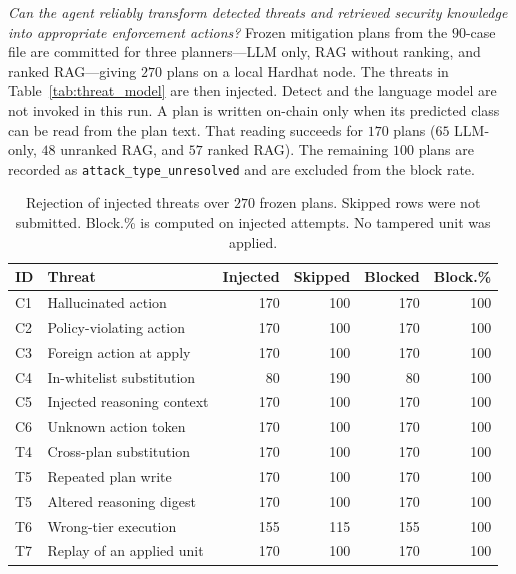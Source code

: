 \documentclass[10pt, conference]{IEEEtran}
\begin{document}
\textit{Can the agent reliably transform detected threats and retrieved security knowledge into appropriate enforcement actions?}
Frozen mitigation plans from the $90$-case file are committed for three planners---LLM only, RAG without ranking, and ranked RAG---giving $270$ plans on a local Hardhat node. The threats in Table~\ref{tab:threat_model} are then injected. Detect and the language model are not invoked in this run. A plan is written on-chain only when its predicted class can be read from the plan text. That reading succeeds for $170$ plans ($65$ LLM-only, $48$ unranked RAG, and $57$ ranked RAG). The remaining $100$ plans are recorded as \texttt{attack\_type\_unresolved} and are excluded from the block rate.

\begin{table}[t]
\centering
\caption{Rejection of injected threats over $270$ frozen plans. Skipped rows were not submitted. Block.\% is computed on injected attempts. No tampered unit was applied.}
\label{tab:agentic}
\setlength{\tabcolsep}{3.5pt}
{\footnotesize
\begin{tabular}{@{}llrrrr@{}}
\toprule
\textbf{ID} & \textbf{Threat} & \textbf{Injected} & \textbf{Skipped} & \textbf{Blocked} & \textbf{Block.\%}\\
\midrule
C1 & Hallucinated action & 170 & 100 & 170 & 100\\
C2 & Policy-violating action & 170 & 100 & 170 & 100\\
C3 & Foreign action at apply & 170 & 100 & 170 & 100\\
C4 & In-whitelist substitution & 80 & 190 & 80 & 100\\
C5 & Injected reasoning context & 170 & 100 & 170 & 100\\
C6 & Unknown action token & 170 & 100 & 170 & 100\\
T4 & Cross-plan substitution & 170 & 100 & 170 & 100\\
T5 & Repeated plan write & 170 & 100 & 170 & 100\\
T5 & Altered reasoning digest & 170 & 100 & 170 & 100\\
T6 & Wrong-tier execution & 155 & 115 & 155 & 100\\
T7 & Replay of an applied unit & 170 & 100 & 170 & 100\\
\bottomrule
\end{tabular}}
\end{table}
\end{document}
